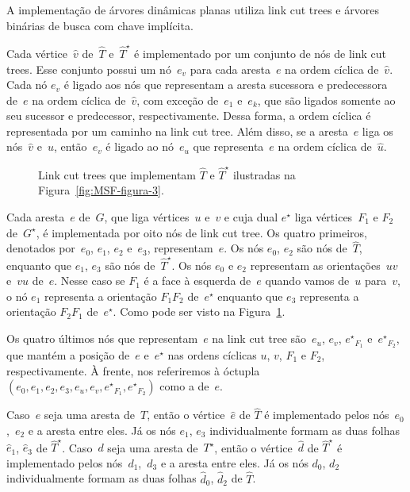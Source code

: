 A implementação de árvores dinâmicas planas utiliza link cut trees e árvores binárias de busca com chave implícita.

Cada vértice~$\hat v$ de~$\hat T$ e~$\hat T^\star$ é implementado por um conjunto de nós de link cut trees.
Esse conjunto possui um nó~$e_v$ para cada aresta~$e$ na ordem cíclica de~$\hat v$.
Cada nó $e_v$ é ligado aos nós que representam a aresta sucessora e predecessora de~$e$ na ordem cíclica de~$\hat v$,
com exceção de~$e_1$ e~$e_k$, que são ligados somente ao seu sucessor e predecessor, respectivamente.
Dessa forma, a ordem cíclica é representada por um caminho na link cut tree.
Além disso, se a aresta~$e$ liga os nós~$\hat v$ e~$\hat u$, então~$e_v$ é ligado ao nó~$e_u$ que representa~$e$ na ordem cíclica de~$\hat u$.

\begin{figure}[htb]
\scalebox{1.5}{
\centering

}
\caption{Link cut trees que implementam $\hat T$ e $\hat T^\star$ ilustradas na Figura~\ref{fig:MSF-figura-3}.}
\label{fig:MSF-figura-4}
\end{figure}

Cada aresta~$e$ de~$G$, que liga vértices~$u$ e~$v$ e cuja dual $e^\star$ liga vértices~$F_1$ e $F_2$ de~$G^\star$, é implementada por oito nós de link cut tree.
Os quatro primeiros, denotados por~$e_0$, $e_1$, $e_2$ e~$e_3$, representam~$e$.
Os nós $e_0$, $e_2$ são nós de~$\hat T$, enquanto que $e_1$, $e_3$ são nós de~$\hat T^\star$.
Os nós $e_0$ e $e_2$ representam as orientações~$uv$ e~$vu$ de~$e$.
Nesse caso se $F_1$ é a face à esquerda de~$e$ quando vamos de~$u$ para~$v$, o nó $e_1$ representa a orientação $F_1F_2$ de~$e^\star$ enquanto que $e_3$ representa a orientação $F_2F_1$ de~$e^\star$.
Como pode ser visto na Figura~\ref{fig:MSF-figura-4}.

Os quatro últimos nós que representam~$e$ na link cut tree são~$e_u$, $e_v$, ${e^\star}_{F_1}$ e~${e^\star}_{F_2}$, que mantém a posição de~$e$ e~$e^\star$ nas ordens cíclicas $u$, $v$, $F_1$ e $F_2$, respectivamente.
À frente, nos referiremos à óctupla $( e_0, e_1, e_2, e_3, e_u, e_v, {e^\star}_{F_1}, {e^\star}_{F_2})$ como a  de~$e$.

Caso~$e$ seja uma aresta de~$T$, então o vértice~$\hat e$ de $\hat T$ é implementado pelos nós~$e_0$,~$e_2$ e a aresta entre eles.
Já os nós $e_1$, $e_3$ individualmente formam as duas folhas $\hat e_1$, $\hat e_3$ de $\hat T^\star$.
Caso~$d$ seja uma aresta de~$T^\star$, então o vértice~$\hat d$ de $\hat T^\star$ é implementado pelos nós~$d_1$,~$d_3$ e a aresta entre eles.
Já os nós $d_0$, $d_2$ individualmente formam as duas folhas $\hat d_0$, $\hat d_2$ de $\hat T$.

